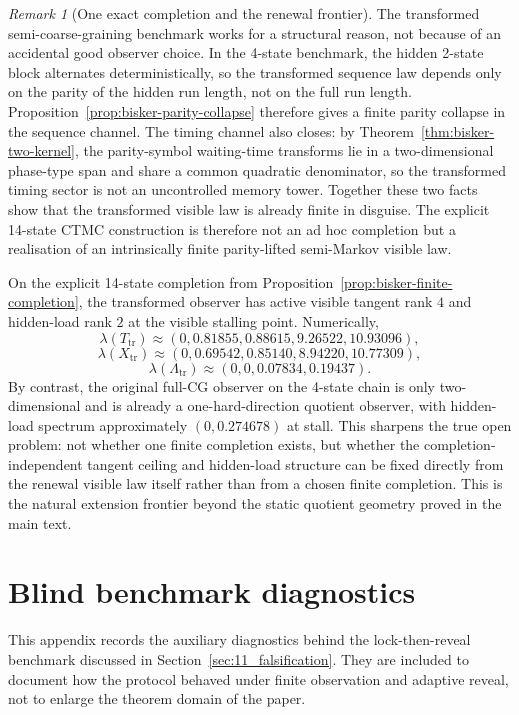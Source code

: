 \documentclass[11pt]{article}
\numberwithin{equation}{section}
\theoremstyle{thmcompact}
\theoremstyle{remark}
\newtheorem*{remarkplain}{Remark}
\newenvironment{remark}[1][]%
{\begin{remarkbox}\begin{remarkplain}[#1]\normalfont}
		{\end{remarkplain}\end{remarkbox}}
\begin{document}
\begin{remark}[One exact completion and the renewal frontier]\label{rem:bisker-renewal-frontier}
The transformed semi-coarse-graining benchmark works for a structural reason, not because of an accidental good observer choice. In the 4-state benchmark, the hidden 2-state block alternates deterministically, so the transformed sequence law depends only on the parity of the hidden run length, not on the full run length. Proposition~\ref{prop:bisker-parity-collapse} therefore gives a finite parity collapse in the sequence channel. The timing channel also closes: by Theorem~\ref{thm:bisker-two-kernel}, the parity-symbol waiting-time transforms lie in a two-dimensional phase-type span and share a common quadratic denominator, so the transformed timing sector is not an uncontrolled memory tower. Together these two facts show that the transformed visible law is already finite in disguise. The explicit 14-state CTMC construction is therefore not an ad hoc completion but a realisation of an intrinsically finite parity-lifted semi-Markov visible law.

On the explicit 14-state completion from Proposition~\ref{prop:bisker-finite-completion}, the transformed observer has active visible tangent rank $4$ and hidden-load rank $2$ at the visible stalling point. Numerically,
\[
\lambda(T_{\mathrm{tr}})\approx (0,0.81855,0.88615,9.26522,10.93096),
\]
\[
\lambda(X_{\mathrm{tr}})\approx (0,0.69542,0.85140,8.94220,10.77309),
\]
\[
\lambda(\Lambda_{\mathrm{tr}})\approx (0,0,0.07834,0.19437).
\]
By contrast, the original full-CG observer on the 4-state chain is only two-dimensional and is already a one-hard-direction quotient observer, with hidden-load spectrum approximately $(0,0.274678)$ at stall. This sharpens the true open problem: not whether one finite completion exists, but whether the completion-independent tangent ceiling and hidden-load structure can be fixed directly from the renewal visible law itself rather than from a chosen finite completion. This is the natural extension frontier beyond the static quotient geometry proved in the main text.
\end{remark}


\section{Blind benchmark diagnostics}\label{app:blind-benchmark}

This appendix records the auxiliary diagnostics behind the lock-then-reveal benchmark discussed in Section~\ref{sec:11_falsification}. They are included to document how the protocol behaved under finite observation and adaptive reveal, not to enlarge the theorem domain of the paper.
\end{document}
